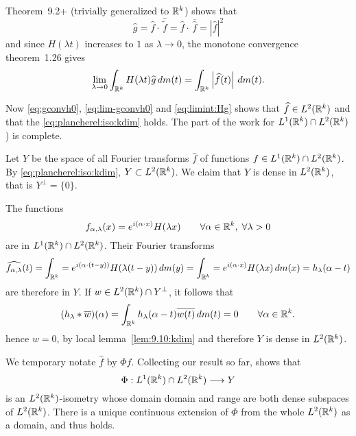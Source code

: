 \begin{enumerate}
\begin{thmproof}
Theorem~9.2+ 
(trivially generalized to \(\mathbb{R}^k\)) shows that 
\begin{equation*}
\widehat{g} 
= \widehat{f} \cdot\,\widehat{\tilde{f}}
= \widehat{f} \cdot\,\overline{\widehat{f}}
= |\widehat{f}|^2
\end{equation*}
and since \(H(\lambda t)\)
increases to $1$ as \(\lambda\to 0\), 
the monotone convergence theorem~1.26 gives
\begin{equation} \label{eq:limint:Hg}
\lim_{\lambda\to 0} \int_{\mathbb{R}^k} H(\lambda t)\widehat{g}\,dm(t)
= \int_{\mathbb{R}^k} \left| \widehat{f}(t)\right|\,dm(t).
\end{equation}

Now
\eqref{eq:gconvh0},
\eqref{eq:lim-gconvh0} and
\eqref{eq:limint:Hg}
shows that \(\widehat{f}\in L^2(\mathbb{R}^k)\) and that
the \eqref{eq:plancherel:iso:kdim} holds.
The part of the work for \(L^1(\mathbb{R}^k)\cap L^2(\mathbb{R}^k)\)) is complete.


Let $Y$ be the space of all Fourier transforms \(\widehat{f}\)
of functions \(f\in L^1(\mathbb{R}^k)\cap L^2(\mathbb{R}^k)\).
By \eqref{eq:plancherel:iso:kdim}, \(Y\subset L^2(\mathbb{R}^k)\).
We claim that $Y$ is dense in \(L^2(\mathbb{R}^k)\),
that is \(Y^\perp = \{0\}\).

The functions 
\begin{equation*}
f_{\alpha,\lambda}(x) = e^{i(\alpha\cdot x)}H(\lambda x)
\qquad \forall \alpha\in\mathbb{R}^k,\; \forall\lambda>0
\end{equation*}
are in \(L^1(\mathbb{R}^k)\cap L^2(\mathbb{R}^k)\). Their Fourier transforms
\begin{equation*}
\widehat{f_{\alpha,\lambda}}(t)
= \int_{\mathbb{R}^k} = e^{i(\alpha\cdot (t-y))}H(\lambda (t-y))\,dm(y)
= \int_{\mathbb{R}^k} = e^{i(\alpha\cdot x)}H(\lambda x)\,dm(x)
= h_\lambda(\alpha-t)
\end{equation*}
are therefore in $Y$. If \(w\in L^2(\mathbb{R}^k)\cap Y^\perp\), it follows that
\begin{equation*}
(h_\lambda \ast \overline{w})(\alpha)
= \int_{\mathbb{R}^k} h_{\lambda}(\alpha-t)\overline{w(t)}\,dm(t) = 0
\qquad \forall \alpha\in\mathbb{R}^k.
\end{equation*}
hence \(w=0\), by local lemma~\ref{lem:9.10:kdim} and therefore
$Y$ is dense in \(L^2(\mathbb{R}^k)\).

We temporary notate \(\widehat{f}\) by \(\Phi f\).
Collecting our result so far, shows that 
\begin{equation*}
\Phi: L^1(\mathbb{R}^k)\cap L^2(\mathbb{R}^k) \longrightarrow Y
\end{equation*}
is an \(L^2(\mathbb{R}^k)\)-isometry whose domain domain and range
are both dense subspaces of \(L^2(\mathbb{R}^k)\).
There is a unique continuous extension of \(\Phi\) from 
the whole \(L^2(\mathbb{R}^k)\) as a domain, and thus  holds.


\end{thmproof}
\end{enumerate}
